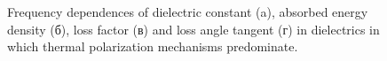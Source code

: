 \documentclass[a4paper,14pt]{extreport}
\begin{document}
\begin{figure}[h]
\caption{Frequency dependences of dielectric constant (a), absorbed energy density (б), loss factor (в) and loss angle tangent (г) in dielectrics in which thermal polarization mechanisms predominate.}
\label{ris1}
\end{figure}
\end{document}
